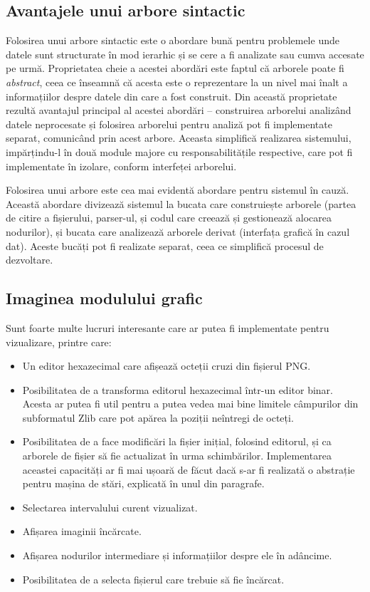 \documentclass[a4paper,12pt]{report}
\begin{document}
\subsection{Avantajele unui arbore sintactic}

Folosirea unui arbore sintactic este o abordare bună pentru problemele 
unde datele sunt structurate în mod ierarhic și se cere a fi analizate sau cumva accesate pe urmă.
Proprietatea cheie a acestei abordări este faptul că arborele poate fi \textit{abstract},
ceea ce înseamnă că acesta este o reprezentare la un nivel mai înalt a informațiilor despre datele
din care a fost construit.
Din această proprietate rezultă avantajul principal al acestei abordări --
construirea arborelui analizând datele neprocesate și folosirea arborelui
pentru analiză pot fi implementate separat, comunicând prin acest arbore.
Aceasta simplifică realizarea sistemului, impărțindu-l în două module majore cu responsabilitățile respective,
care pot fi implementate în izolare, conform interfeței arborelui.

Folosirea unui arbore este cea mai evidentă abordare pentru sistemul în cauză.
Această abordare divizează sistemul la bucata care construiește arborele
(partea de citire a fișierului, parser-ul, și codul care creează și gestionează alocarea nodurilor),
și bucata care analizează arborele derivat (interfața grafică în cazul dat).
Aceste bucăți pot fi realizate separat, ceea ce simplifică procesul de dezvoltare.

\subsection{Imaginea modulului grafic}

Sunt foarte multe lucruri interesante care ar putea fi implementate pentru vizualizare, printre care:
\begin{itemize}
    \item
        Un editor hexazecimal care afișează octeții cruzi din fișierul \ac{PNG}. 
    \item
        Posibilitatea de a transforma editorul hexazecimal într-un editor binar.
        Acesta ar putea fi util pentru a putea vedea mai bine limitele câmpurilor din
        subformatul Zlib care pot apărea la poziții neîntregi de octeți.
    \item
        Posibilitatea de a face modificări la fișier inițial, folosind editorul,
        și ca arborele de fișier să fie actualizat în urma schimbărilor.
        Implementarea aceastei capacități ar fi mai ușoară de făcut dacă s-ar fi realizată
        o abstrație pentru mașina de stări, explicată în unul din paragrafe.
    \item
        Selectarea intervalului curent vizualizat.
    \item
        Afișarea imaginii încărcate.
    \item
        Afișarea nodurilor intermediare și informațiilor despre ele în adâncime.
    \item
        Posibilitatea de a selecta fișierul care trebuie să fie încărcat.
\end{itemize}
\end{document}

